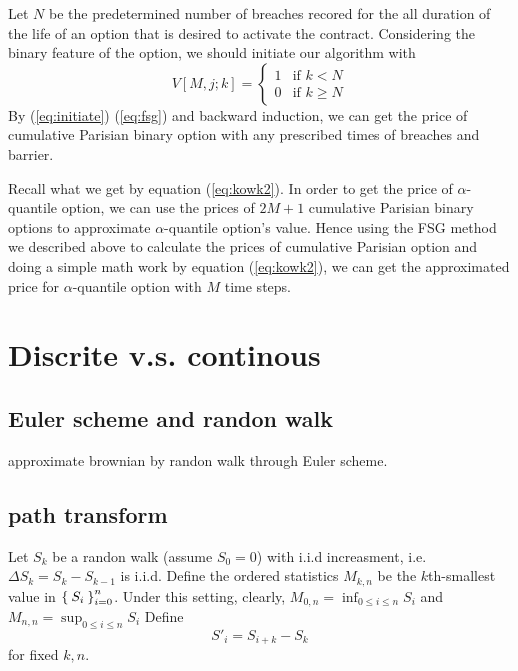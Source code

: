 \documentclass[11pt]{book}
\begin{document}
Let $N$ be the predetermined number of breaches recored for the all duration of the life of an option that is desired to activate   the contract. 
Considering the binary feature of the option, we should initiate our algorithm with
\begin{equation}\label{eq:initiate}
V[M,j;k] = \begin {cases}
1 & \text{if }  k < N \\
0 & \text{if }  k \geq N
\end{cases}
\end{equation}
By (\ref{eq:initiate})  (\ref{eq:fsg}) and backward induction, we can get the price of cumulative Parisian binary option with any prescribed times of breaches and barrier. 

Recall what we get by equation (\ref{eq:kowk2}). In order to get the price of $\alpha$-quantile option, we can use the prices of $2M + 1$ cumulative Parisian binary options to approximate $\alpha$-quantile option's value. Hence using the FSG method we described above to calculate the prices of cumulative Parisian option  and doing a simple math work by equation (\ref{eq:kowk2}), we can get the approximated price for $\alpha$-quantile option with $M$ time steps.  



 
 











\section{Discrite v.s. continous}
\subsection{Euler scheme and randon walk}
approximate brownian by randon walk through Euler scheme.

\subsection{path transform}
Let $S_k$ be a randon walk (assume $S_0=0$) 
with i.i.d increasment, i.e. 
$\Delta S_k = S_k -  S_{k-1}$ is i.i.d. 
Define the ordered statistics $M_{k,n}$ be the $k$th-smallest value in
$\Set{S_i}_{i=0}^n$. 
Under this setting, clearly, $M_{0,n} = \inf_{0\leq i\leq n}S_i$
and $M_{n,n} = \sup_{0\leq i\leq n}S_i$
Define 
\[S'_i = S_{i+k}-S_k\] 
for fixed $k, n$.  
\end{document}
